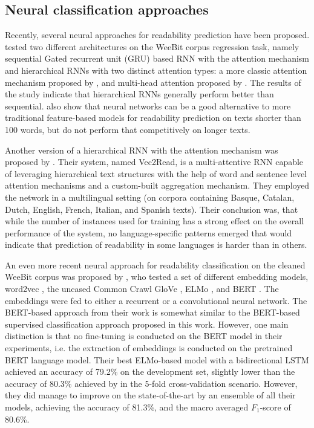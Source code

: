 \documentclass{clv3}
\begin{document}
\subsection{Neural classification approaches}
\label{sec:neural-classification}



Recently, several neural approaches for readability prediction have been proposed. \citet{nadeem2018estimating} tested two different architectures on the WeeBit corpus regression task, namely sequential Gated recurrent unit (GRU) \citep{cho2014learning} based RNN with the attention mechanism and hierarchical RNNs \citep{yang2016hierarchical} with two distinct attention types: a more classic attention mechanism proposed by \citet{bahdanau2014neural}, and multi-head attention proposed by \citet{vaswani2017attention}. The results of the study indicate that hierarchical RNNs generally perform better than sequential. \citet{nadeem2018estimating} also show that neural networks can be a good alternative to more traditional feature-based models for readability prediction on texts shorter than 100 words, but do not perform that competitively on longer texts.

Another version of a hierarchical RNN with the attention mechanism was proposed by \citet{azpiazu-pera-2019-multiattentive}. Their system, named Vec2Read, is a multi-attentive RNN capable of leveraging hierarchical text structures with the help of word and sentence level attention mechanisms and a custom-built aggregation mechanism. They employed the network in a multilingual setting (on corpora containing Basque, Catalan, Dutch, English, French, Italian, and Spanish texts). Their conclusion was, that while the number of instances used for training has a strong effect on the overall performance of the system, no language-specific patterns emerged that would indicate that prediction of readability in some languages is harder than in others.

An even more recent neural approach for readability classification on the cleaned WeeBit corpus \citep{xia2016text} was proposed by \citet{filighera2019automatic}, who tested a set of different embedding models, word2vec \citep{mikolov2013distributed}, the uncased Common Crawl GloVe \citep{pennington2014glove}, ELMo \citep{peters2018deep}, and BERT \citep{devlin2018bert}. The embeddings were fed to either a recurrent or a convolutional neural network. The BERT-based approach from their work is somewhat similar to the BERT-based supervised classification approach proposed in this work. However, one main distinction is that no fine-tuning is conducted on the BERT model in their experiments, i.e. the extraction of embeddings is conducted on the pretrained BERT language model. Their best ELMo-based model with a bidirectional LSTM achieved an accuracy of 79.2\% on the development set, slightly lower than the accuracy of 80.3\% achieved by \citet{xia2016text} in the 5-fold cross-validation scenario. However, they did manage to improve on the state-of-the-art by an ensemble of all their models, achieving the accuracy of 81.3\%, and the macro averaged $F_1$-score of 80.6\%.
\end{document}
